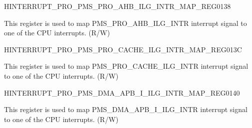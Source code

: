 \begin{register}{H}{INTERRUPT\_PRO\_PMS\_PRO\_AHB\_ILG\_INTR\_MAP\_REG}{\hexprefix{}0138}\label{regdesc:INTERRUPTPROPMSPROAHBILGINTRMAPREG}
%
%
\regnewline%
\begin{regdesc}\begin{reglist}
\label{fielddesc:INTERRUPTPROPMSPROAHBILGINTRMAP}\item [INTERRUPT\_PRO\_PMS\_PRO\_AHB\_ILG\_INTR\_MAP] This register is used to map PMS\_PRO\_AHB\_ILG\_INTR interrupt signal to one of the CPU interrupts. (R/W)
\end{reglist}\end{regdesc}
\end{register}


\begin{register}{H}{INTERRUPT\_PRO\_PMS\_PRO\_CACHE\_ILG\_INTR\_MAP\_REG}{\hexprefix{}013C}\label{regdesc:INTERRUPTPROPMSPROCACHEILGINTRMAPREG}
%
%
\regnewline%
\begin{regdesc}\begin{reglist}
\label{fielddesc:INTERRUPTPROPMSPROCACHEILGINTRMAP}\item [INTERRUPT\_PRO\_PMS\_PRO\_CACHE\_ILG\_INTR\_MAP] This register is used to map PMS\_PRO\_CACHE\_ILG\_INTR interrupt signal to one of the CPU interrupts. (R/W)
\end{reglist}\end{regdesc}
\end{register}


\begin{register}{H}{INTERRUPT\_PRO\_PMS\_DMA\_APB\_I\_ILG\_INTR\_MAP\_REG}{\hexprefix{}0140}\label{regdesc:INTERRUPTPROPMSDMAAPBIILGINTRMAPREG}
%
%
\regnewline%
\begin{regdesc}\begin{reglist}
\label{fielddesc:INTERRUPTPROPMSDMAAPBIILGINTRMAP}\item [INTERRUPT\_PRO\_PMS\_DMA\_APB\_I\_ILG\_INTR\_MAP] This register is used to map PMS\_DMA\_APB\_I\_ILG\_INTR interrupt signal to one of the CPU interrupts. (R/W)
\end{reglist}\end{regdesc}
\end{register}


